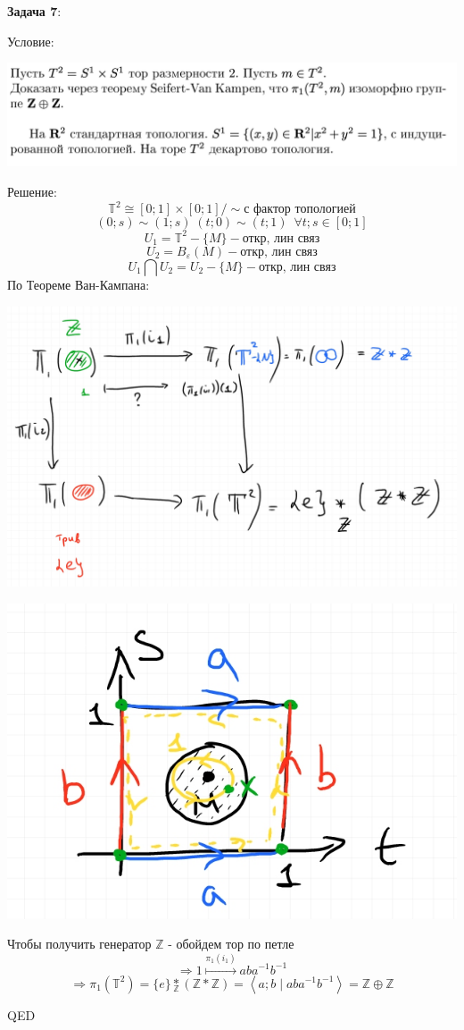 \documentclass[12pt]{article}
\begin{document}
\begin{large}
\par \textbf{Задача 7}:
\par Условие:
\par
\includegraphics[width=1\textwidth]{photo_7.png}
\par Решение:
\[
    \mathbb{T}^2 \cong [0; 1] \times [0; 1]/ \sim  \text{с фактор топологией}
\]
\[
    (0; s) \sim (1; s) \; (t; 0) \sim (t; 1) \, \, \, \forall t ; s \in [0; 1]
\]
\[
    U_1 = \mathbb{T}^2 - \{M\} - \text{откр, лин связ}
\]
\[
    U_2 = B_{\varepsilon}(M) - \text{откр, лин связ}
\]
\[
    U_1 \bigcap U_2 = U_2 - \{M\} - \text{откр, лин связ}
\]
По Теореме Ван-Кампана:
\par
\includegraphics[width=1\textwidth]{photo_71.jpg}
\par
\includegraphics[width=1\textwidth]{photo_72.jpg}
\par Чтобы получить генератор $\mathbb{Z}$ - обойдем тор по петле
\[
    \Rightarrow 1 \overset{\pi_1(i_1)}{\longmapsto} aba^{-1}b^{-1}
\]
\[
    \Rightarrow \pi_1(\mathbb{T}^2) = \{e\} \underset{\mathbb{Z}}{*} (\mathbb{Z} * \mathbb{Z}) = \left< a; b \mid aba^{-1}b^{-1} \right> = \mathbb{Z} \oplus \mathbb{Z}
\]
\par QED


\end{large}
\end{document}
